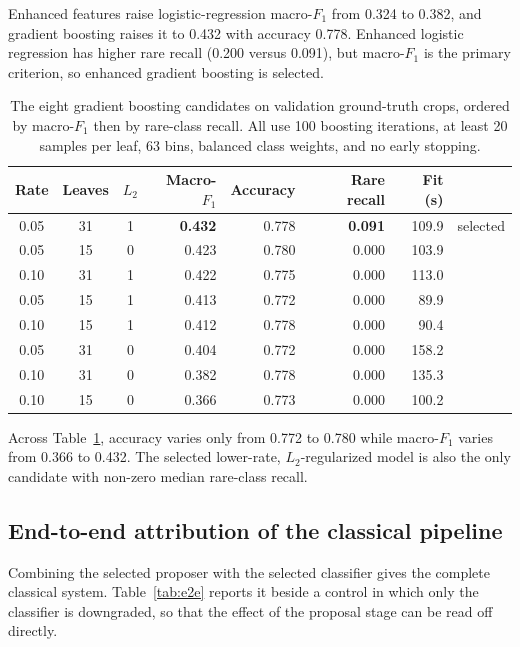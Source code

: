 \documentclass[a4paper,8pt]{article}
\begin{document}
Enhanced features raise logistic-regression macro-$F_1$ from 0.324 to 0.382, and gradient
boosting raises it to 0.432 with accuracy 0.778. Enhanced logistic regression has higher rare
recall (0.200 versus 0.091), but macro-$F_1$ is the primary criterion, so enhanced gradient
boosting is selected.

\begin{table}[H]
\centering
\small
\renewcommand{\arraystretch}{1.15}
\begin{tabularx}{0.97\textwidth}{|c|c|c|r|r|r|r|X|}
\hline
\textbf{Rate} & \textbf{Leaves} & \textbf{$L_2$} & \textbf{Macro-$F_1$} & \textbf{Accuracy} & \textbf{Rare recall} & \textbf{Fit (s)} & \\
\hline
0.05 & 31 & 1 & \textbf{0.432} & 0.778 & \textbf{0.091} & 109.9 & selected\\
\hline
0.05 & 15 & 0 & 0.423 & 0.780 & 0.000 & 103.9 & \\
\hline
0.10 & 31 & 1 & 0.422 & 0.775 & 0.000 & 113.0 & \\
\hline
0.05 & 15 & 1 & 0.413 & 0.772 & 0.000 & 89.9 & \\
\hline
0.10 & 15 & 1 & 0.412 & 0.778 & 0.000 & 90.4 & \\
\hline
0.05 & 31 & 0 & 0.404 & 0.772 & 0.000 & 158.2 & \\
\hline
0.10 & 31 & 0 & 0.382 & 0.778 & 0.000 & 135.3 & \\
\hline
0.10 & 15 & 0 & 0.366 & 0.773 & 0.000 & 100.2 & \\
\hline
\end{tabularx}
\caption{The eight gradient boosting candidates on validation ground-truth crops, ordered by
macro-$F_1$ then by rare-class recall. All use 100 boosting iterations, at least 20 samples per
leaf, 63 bins, balanced class weights, and no early stopping.}
\label{tab:hgb-grid}
\end{table}

Across Table~\ref{tab:hgb-grid}, accuracy varies only from 0.772 to 0.780 while macro-$F_1$
varies from 0.366 to 0.432. The selected lower-rate, $L_2$-regularized model is also the only
candidate with non-zero median rare-class recall.

\subsection{End-to-end attribution of the classical pipeline}
\label{sec:attribution}

Combining the selected proposer with the selected classifier gives the complete classical system.
Table~\ref{tab:e2e} reports it beside a control in which only the classifier is downgraded, so
that the effect of the proposal stage can be read off directly.
\end{document}
